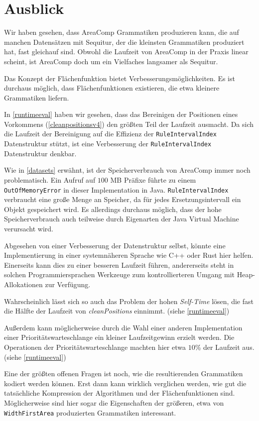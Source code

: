 \chapter{Ausblick}
\label{ausblick}

Wir haben gesehen, dass AreaComp Grammatiken produzieren kann, die auf manchen Datensätzen mit Sequitur, der die kleinsten Grammatiken produziert hat, fast gleichauf sind. Obwohl die Laufzeit von AreaComp in der Praxis linear scheint, ist AreaComp doch um ein Vielfaches langsamer als Sequitur. 

Das Konzept der Flächenfunktion bietet Verbesserungsmöglichkeiten. Es ist durchaus möglich, dass Flächenfunktionen existieren, die etwa kleinere Grammatiken liefern. 

In \autoref{runtimeeval} haben wir gesehen, dass das Bereinigen der Positionen eines Vorkommens (\autoref{cleanpositionsv4}) den größten Teil der Laufzeit ausmacht. Da sich die Laufzeit der Bereinigung auf die Effizienz der \texttt{RuleIntervalIndex} Datenstruktur stützt, ist eine Verbesserung der \texttt{RuleIntervalIndex} Datenstruktur denkbar.

Wie in \autoref{datasets} erwähnt, ist der Speicherverbrauch von AreaComp immer noch problematisch. Ein Aufruf auf $100$ MB Präfixe führte zu einem \texttt{OutOfMemoryError} in dieser Implementation in Java. 
\texttt{RuleIntervalIndex} verbraucht eine große Menge an Speicher, da für jedes Ersetzungsintervall ein Objekt gespeichert wird. 
Es allerdings durchaus möglich, dass der hohe Speicherverbrauch auch teilweise durch Eigenarten der Java Virtual Machine verursacht wird.

Abgesehen von einer Verbesserung der Datenstruktur selbst, könnte eine Implementierung in einer systemnäheren Sprache wie C++ oder Rust hier helfen.
Einerseits kann dies zu einer besseren Laufzeit führen, andererseits steht in solchen Programmiersprachen Werkzeuge zum kontrollierteren Umgang mit Heap-Allokationen zur Verfügung.

Wahrscheinlich lässt sich so auch das Problem der hohen \emph{Self-Time} lösen, die fast die Hälfte der Laufzeit von \emph{cleanPositions} einnimmt. (siehe \autoref{runtimeeval})

Außerdem kann möglicherweise durch die Wahl einer anderen Implementation einer Prioritätswarteschlange ein kleiner Laufzeitgewinn erzielt werden. Die Operationen der Prioritätswarteschlange machten hier etwa $10$\% der Laufzeit aus. (siehe \autoref{runtimeeval})

Eine der größten offenen Fragen ist noch, wie die resultierenden Grammatiken kodiert werden können. Erst dann kann wirklich verglichen werden, wie gut die tatsächliche Kompression der Algorithmen und der Flächenfunktionen sind. Möglicherweise sind hier sogar die Eigenschaften der größeren, etwa von \texttt{WidthFirstArea} produzierten Grammatiken interessant. 